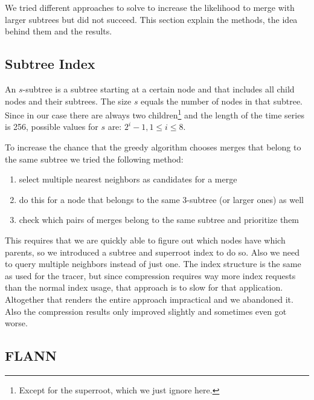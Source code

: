 We tried different approaches to solve to increase the likelihood to merge with larger subtrees but did not succeed. This section explain the methods, the idea behind them and the results.


\subsection{Subtree Index}
\label{ssec:algorithm:fail:stindex}

\begin{definition}[$s$-subtree]
    An $s$-subtree is a subtree starting at a certain node and that includes all child nodes and their subtrees. The size $s$ equals the number of nodes in that subtree. Since in our case there are always two children\footnote{Except for the superroot, which we just ignore here.} and the length of the time series is \num{256}, possible values for $s$ are: $2^i - 1, 1 \leq i \leq 8$.
\end{definition}

To increase the chance that the greedy algorithm chooses merges that belong to the same subtree we tried the following method:

\begin{enumerate}
    \item select multiple nearest neighbors as candidates for a merge
    \item do this for a node that belongs to the same \num{3}-subtree (or larger ones) as well
    \item check which pairs of merges belong to the same subtree and prioritize them
\end{enumerate}

This requires that we are quickly able to figure out which nodes have which parents, so we introduced a subtree and superroot index to do so. Also we need to query multiple neighbors instead of just one. The index structure is the same as used for the tracer, but since compression requires way more index requests than the normal index usage, that approach is to slow for that application. Altogether that renders the entire approach impractical and we abandoned it. Also the compression results only improved slightly and sometimes even got worse.


\subsection{FLANN}
\label{ssec:algorithm:fail:flann}

